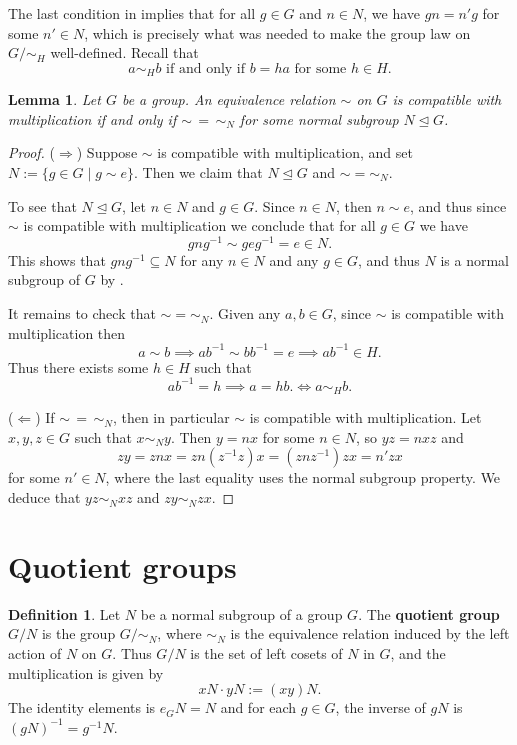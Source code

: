 \documentclass[12pt]{report}
\newtheorem{lemma}[theorem]{Lemma}
\numberwithin{equation}{section}
\numberwithin{theorem}{chapter}
\theoremstyle{definition}
\newtheorem{definition}[theorem]{Definition}
\newtheorem*{basic properties}{Basic Properties}
\newtheorem*{Important Remark}{Important Remark}
\newcommand{\df}[1]{{\bf #1}\index{#1}}
\begin{document}
The last condition in  implies that for all $g \in G$ and $n \in N$, we have $gn = n'g$ for some $n' \in N$, which is precisely what was needed to make the group law on $G/\sim_H$ well-defined. Recall that
$$a \sim_H b \textrm{ if and only if } b = ha \text{ for some } h \in H.$$ 



\begin{lemma} 
Let $G$ be a group. An equivalence relation $\sim$ on $G$ is compatible with multiplication if and only if $\sim \,=  \,\sim_N$ for some normal subgroup $N \trianglelefteq G$.
\end{lemma}

\begin{proof}
($\Rightarrow$) Suppose $\sim$ is compatible with multiplication, and set $N := \{g \in G \mid g \sim e\}$. Then we claim that $N\trianglelefteq G$ and $\sim=\sim_N$.

To see that $N\trianglelefteq G$, let $n\in N$ and $g\in G$. Since $n\in N$, then $n \sim e$, and thus since $\sim$ is compatible with multiplication we conclude that for all $g \in G$ we have
$$gng^{-1}\sim geg^{-1} = e \in N.$$ 
This shows that $gng^{-1} \subseteq N$ for any $n \in N$ and any $g\in G$, and thus $N$ is a normal subgroup of $G$ by .

It remains to check that $\sim=\sim_N$. Given any $a, b \in G$, since $\sim$ is compatible with multiplication then
$$a \sim b \implies ab^{-1} \sim bb^{-1} = e \implies ab^{-1} \in H.$$
Thus there exists some $h \in H$ such that
$$ab^{-1} = h \implies a = hb. \iff a \sim_H b.$$

($\Leftarrow$) If $\sim \,=  \,\sim_N$, then in particular $\sim$ is compatible with multiplication. Let $x,y,z\in G$ such that $x\sim_N y$. Then $y=nx$ for some $n\in N$, so $yz=nxz$ and $$zy=znx=zn(z^{-1}z)x=(znz^{-1})zx=n'zx$$ 
 for some $n'\in N$, where the last equality uses the normal subgroup property. We deduce that $yz\sim_N xz$ and $zy\sim_N zx$.
\end{proof}


\section{Quotient groups}


\begin{definition}\label{$G/N$}
Let $N$ be a normal subgroup of a group $G$. The \df{quotient group} $G/N$ is the group $G/\sim_N$, where $\sim_N$ is the equivalence relation induced by the left action of $N$ on $G$. Thus $G/N$ is the set of left cosets of $N$ in $G$, and the multiplication is given by 
$$xN\cdot yN := (xy)N.$$ 
The identity elements is $e_GN = N$ and for each $g \in G$, the inverse of $gN$ is $(gN)^{-1} = g^{-1}N$.
\end{definition}
\end{document}
